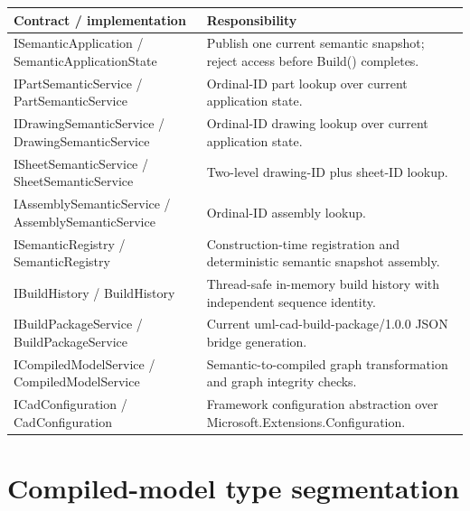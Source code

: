 \documentclass[11pt,a4paper]{report}
\begin{document}
\begin{longtable}{@{}p{}p{}@{}}
\toprule
Contract / implementation & Responsibility \\
\midrule
ISemanticApplication / SemanticApplicationState & Publish one current semantic snapshot; reject access before Build() completes. \\
IPartSemanticService / PartSemanticService & Ordinal-ID part lookup over current application state. \\
IDrawingSemanticService / DrawingSemanticService & Ordinal-ID drawing lookup over current application state. \\
ISheetSemanticService / SheetSemanticService & Two-level drawing-ID plus sheet-ID lookup. \\
IAssemblySemanticService / AssemblySemanticService & Ordinal-ID assembly lookup. \\
ISemanticRegistry / SemanticRegistry & Construction-time registration and deterministic semantic snapshot assembly. \\
IBuildHistory / BuildHistory & Thread-safe in-memory build history with independent sequence identity. \\
IBuildPackageService / BuildPackageService & Current uml-cad-build-package/1.0.0 JSON bridge generation. \\
ICompiledModelService / CompiledModelService & Semantic-to-compiled graph transformation and graph integrity checks. \\
ICadConfiguration / CadConfiguration & Framework configuration abstraction over Microsoft.Extensions.Configuration. \\
\bottomrule
\end{longtable}

\section{Compiled-model type segmentation}
\end{document}

